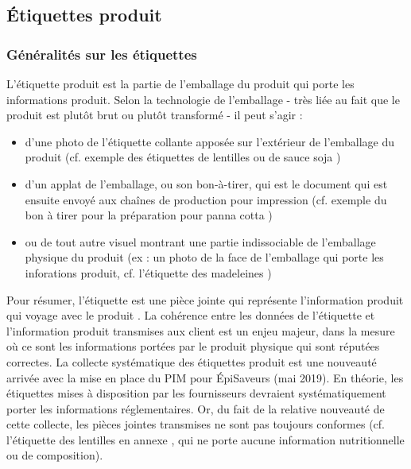             \subsection{\'{E}tiquettes produit}
            \label{etiquettes_produit}

            \subsubsection{Généralités sur les étiquettes}
            L'étiquette produit est la partie de l'emballage du produit qui porte les informations produit.
            Selon la technologie de l'emballage - très liée au fait que le produit est plutôt brut ou plutôt transformé - il peut s'agir :
            \begin{itemize}
                \item d'une photo de l'étiquette collante apposée sur l'extérieur de l'emballage du produit (cf. exemple des étiquettes de lentilles  ou de sauce soja )
                \item d'un applat de l'emballage, ou son bon-à-tirer, qui est le document qui est ensuite envoyé aux chaînes de production pour impression (cf. exemple du bon à tirer pour la préparation pour panna cotta )
                \item ou de tout autre visuel montrant une partie indissociable de l'emballage physique du produit (ex : un photo de la face de l'emballage qui porte les inforations produit, cf. l'étiquette des madeleines )
            \end{itemize}
            Pour résumer, l'étiquette est une pièce jointe qui représente l'information produit qui \og voyage avec le produit \fg.
            La cohérence entre les données de l'étiquette et l'information produit transmises aux client est un enjeu majeur, dans la mesure où ce sont les informations portées par le produit physique qui sont réputées correctes.
            La collecte systématique des étiquettes produit est une nouveauté arrivée avec la mise en place du PIM pour \'{E}piSaveurs (mai 2019).
            En théorie, les étiquettes mises à disposition par les fournisseurs devraient systématiquement porter les informations réglementaires.
            Or, du fait de la relative nouveauté de cette collecte, les pièces jointes transmises ne sont pas toujours conformes (cf. l'étiquette des lentilles en annexe , qui ne porte aucune information nutritionnelle ou de composition).

